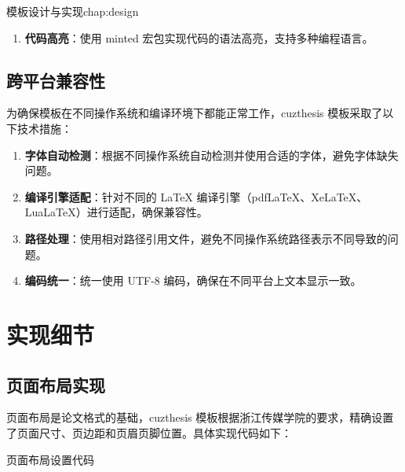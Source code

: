 \begin{cuzchapter}{模板设计与实现}{chap:design}
\begin{enumerate}
        \item \textbf{代码高亮}：使用 minted 宏包实现代码的语法高亮，支持多种编程语言。
    \end{enumerate}
    
    \subsection{跨平台兼容性}
    
    为确保模板在不同操作系统和编译环境下都能正常工作，cuzthesis 模板采取了以下技术措施：
    
    \begin{enumerate}
        \item \textbf{字体自动检测}：根据不同操作系统自动检测并使用合适的字体，避免字体缺失问题。
        
        \item \textbf{编译引擎适配}：针对不同的 LaTeX 编译引擎（pdfLaTeX、XeLaTeX、LuaLaTeX）进行适配，确保兼容性。
        
        \item \textbf{路径处理}：使用相对路径引用文件，避免不同操作系统路径表示不同导致的问题。
        
        \item \textbf{编码统一}：统一使用 UTF-8 编码，确保在不同平台上文本显示一致。
    \end{enumerate}
    
    \section{实现细节}\label{sec:implementation-details}
    
    \subsection{页面布局实现}
    
    页面布局是论文格式的基础，cuzthesis 模板根据浙江传媒学院的要求，精确设置了页面尺寸、页边距和页眉页脚位置。具体实现代码如下：
    
    \begin{listing}[htbp]
        \caption{页面布局设置代码}
        \label{code:page-layout}
        \begin{texcode}
            \RequirePackage{geometry}
            \geometry{
                paper=a4paper,
                top=2.5cm, bottom=2.5cm,
                left=3cm, right=2cm,
                headheight=0.5cm, footskip=0.8cm
            }
        \end{texcode}
    \end{listing}
    

\end{cuzchapter}
